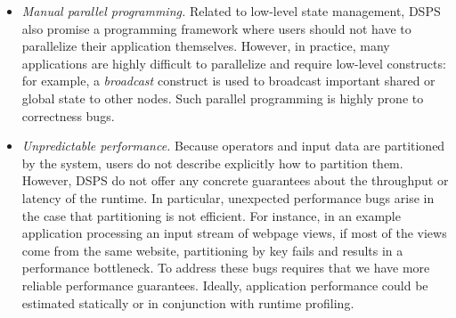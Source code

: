 \begin{itemize}

\item \emph{Manual parallel programming.}
Related to low-level state management, DSPS also promise a programming framework
where users should not have to parallelize their application themselves.
However, in practice, many applications are highly difficult to parallelize and require low-level constructs: for example, a \emph{broadcast} construct is used to broadcast important shared or global state to other nodes.
Such parallel programming is highly prone to correctness bugs.

\item \emph{Unpredictable performance.}
Because operators and input data are partitioned by the system, users
do not describe explicitly how to partition them.
However, DSPS do not offer any concrete guarantees about the throughput or latency of the runtime.
In particular, unexpected performance bugs arise in the
case that partitioning is not efficient.
For instance, in an example application processing
an input stream of webpage views, if most of the views come from the same website,
partitioning by key fails and results in a performance bottleneck.
To address these bugs requires that we have more reliable performance guarantees.
Ideally, application performance could be estimated statically or in conjunction with runtime profiling.
\end{itemize}
